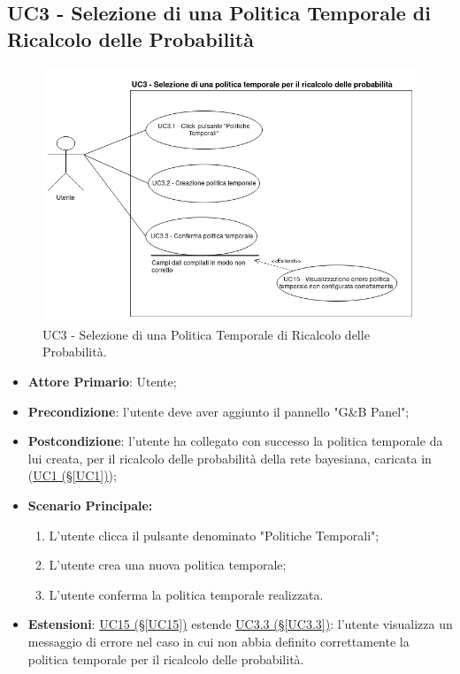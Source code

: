 \subsection{UC3 - Selezione di una Politica Temporale di Ricalcolo delle Probabilità}\label{UC3}

\begin{figure}[H]
\centering
\includegraphics[scale=0.5]{./images/UC3.png}
\caption{UC3 - Selezione di una Politica Temporale di Ricalcolo delle Probabilità.}
\end{figure}

\begin{itemize}
	\item \textbf{Attore Primario}: Utente; 
	\item \textbf{Precondizione}: l'utente deve aver aggiunto il pannello "G\&B Panel";
	\item \textbf{Postcondizione}: l'utente ha collegato con successo la politica temporale da lui creata, per il ricalcolo delle probabilità della rete bayesiana, caricata in (\hyperref[UC1]{UC1 (§\ref*{UC1})});	
	\item \textbf{Scenario Principale:}
	\begin{enumerate}
		\item L'utente clicca il pulsante denominato "Politiche Temporali";
		\item L'utente crea una nuova politica temporale; 
		\item L'utente conferma la politica temporale realizzata.
	\end{enumerate}
	\item \textbf{Estensioni}: \hyperref[UC15]{UC15 (§\ref*{UC15})} estende \hyperref[UC3.3]{UC3.3 (§\ref*{UC3.3})}: l'utente visualizza un messaggio di errore nel caso in cui non abbia definito correttamente la politica temporale per il ricalcolo delle probabilità.
	
\end{itemize}


